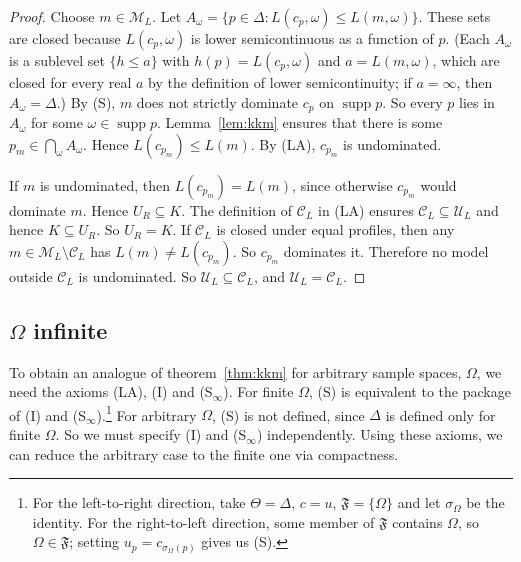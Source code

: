 \documentclass[11pt]{article}
\theoremstyle{definition}
\theoremstyle{remark}
\newcommand{\M}{\mathcal M}
\newcommand{\C}{\mathcal C}
\newcommand{\F}{\mathfrak F}
\newcommand{\U}{\mathcal U}
\newcommand{\supp}{\operatorname{supp}}
\begin{document}
\begin{proof}
Choose $m\in\M_L$. Let $A_\omega=\{p\in\Delta:L(c_p,\omega)\le L(m,\omega)\}$. These sets are closed because $L(c_p,\omega)$ is lower semicontinuous as a function of $p$. (Each $A_\omega$ is a sublevel set $\{h\le a\}$ with $h(p)=L(c_p,\omega)$ and $a=L(m,\omega)$, which are closed for every real $a$ by the definition of lower semicontinuity; if $a=\infty$, then $A_\omega=\Delta$.) By (S), $m$ does not strictly dominate $c_p$ on $\supp p$. So every $p$ lies in $A_\omega$ for some $\omega\in\supp p$. Lemma~\ref{lem:kkm} ensures that there is some $p_m\in\bigcap_\omega A_\omega$. Hence $L(c_{p_m})\le L(m)$. By (LA), $c_{p_m}$ is undominated.

If $m$ is undominated, then $L(c_{p_m})=L(m)$, since otherwise $c_{p_m}$ would dominate $m$. Hence $U_R\subseteq K$. The definition of $\C_L$ in (LA) ensures $\C_L\subseteq\U_L$ and hence $K\subseteq U_R$. So $U_R = K$. If $\C_L$ is closed under equal profiles, then any $m\in\M_L\setminus\C_L$ has $L(m)\ne L(c_{p_m})$. So $c_{p_m}$ dominates it. Therefore no model outside $\C_L$ is undominated. So $\U_L\subseteq\C_L$, and $\U_L=\C_L$.
\end{proof}





\subsection{$\Omega$ infinite}\label{sec:infinite}


To obtain an analogue of theorem~\ref{thm:kkm} for arbitrary sample spaces, $\Omega$, we need the axioms (LA), (I) and (S$_\infty$). For finite $\Omega$, (S) is equivalent to the package of (I) and (S$_\infty$).\footnote{For the left-to-right direction, take $\Theta=\Delta$, $c=u$, $\F=\{\Omega\}$ and let $\sigma_\Omega$ be the identity. For the right-to-left direction, some member of $\F$ contains $\Omega$, so $\Omega\in\F$; setting $u_p=c_{\sigma_\Omega(p)}$ gives us (S).} For arbitrary $\Omega$, (S) is not defined, since $\Delta$ is defined only for finite $\Omega$. So we must specify (I) and (S$_\infty$) independently. Using these axioms, we can reduce the arbitrary case to the finite one via compactness.
\end{document}
